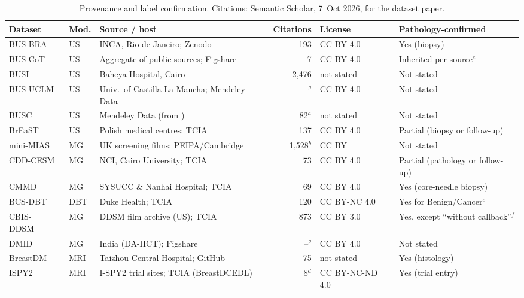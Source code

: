 \documentclass[11pt]{article}
\begin{document}
\begin{table}[!htbp]
  \centering
  \footnotesize
  \setlength{\tabcolsep}{4pt}
  \caption{Provenance and label confirmation. Citations: Semantic Scholar, 7~Oct 2026, for the dataset paper.}
  \label{tab:provenance}
  \begin{tabularx}{\textwidth}{@{}l l Y r L{2.0cm} L{2.6cm}@{}}
    \toprule
    Dataset & Mod. & Source / host & Citations & License & Pathology-confirmed \\
    \midrule
    BUS-BRA~\citep{gomezflores2024busbra} & US & INCA, Rio de Janeiro; Zenodo & 193 & CC BY 4.0 & Yes (biopsy) \\
    BUS-CoT~\citep{yu2025buscot} & US & Aggregate of public sources; Figshare & 7 & CC BY 4.0 & Inherited per source$^{e}$ \\
    BUSI~\citep{aldhabyani2020busi} & US & Baheya Hospital, Cairo & 2,476 & not stated & Not stated \\
    BUS-UCLM~\citep{busuclm2025mendeley} & US & Univ.\ of Castilla-La Mancha; Mendeley Data & --$^{g}$ & CC BY 4.0 & Not stated \\
    BUSC~\citep{busc2023mendeley} & US & Mendeley Data (from \citep{rodrigues2017bus}) & 82$^{a}$ & not stated & Not stated \\
    BrEaST~\citep{pawlowska2024breast} & US & Polish medical centres; TCIA & 137 & CC BY 4.0 & Partial (biopsy or follow-up) \\
    mini-MIAS~\citep{suckling1994mias} & MG & UK screening films; PEIPA/Cambridge & 1,528$^{b}$ & CC BY & Not stated \\
    CDD-CESM~\citep{khaled2022cddcesm} & MG & NCI, Cairo University; TCIA & 73 & CC BY 4.0 & Partial (pathology or follow-up) \\
    CMMD~\citep{cai2023cmmd} & MG & SYSUCC \& Nanhai Hospital; TCIA & 69 & CC BY 4.0 & Yes (core-needle biopsy) \\
    BCS-DBT~\citep{buda2021bcsdbt} & DBT & Duke Health; TCIA & 120 & CC BY-NC 4.0 & Yes for Benign/Cancer$^{c}$ \\
    CBIS-DDSM~\citep{lee2017cbisddsm} & MG & DDSM film archive (US); TCIA & 873 & CC BY 3.0 & Yes, except ``without callback''$^{f}$ \\
    DMID~\citep{oza2024dmid} & MG & India (DA-IICT); Figshare & --$^{g}$ & CC BY 4.0 & Not stated \\
    BreastDM~\citep{zhao2023breastdm} & MRI & Taizhou Central Hospital; GitHub & 75 & not stated & Yes (histology) \\
    ISPY2~\citep{fridman2026breastdcedl} & MRI & I-SPY2 trial sites; TCIA (BreastDCEDL) & 8$^{d}$ & CC BY-NC-ND 4.0 & Yes (trial entry) \\

\end{tabularx}
\end{table}
\end{document}
